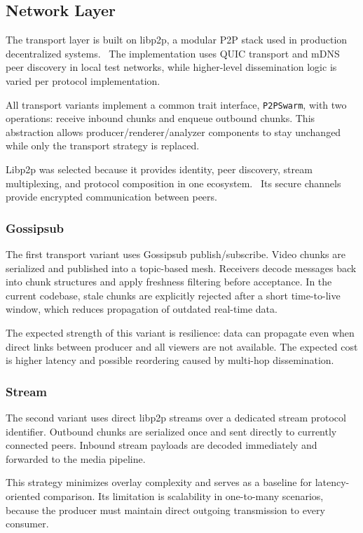 \subsection{Network Layer}
The transport layer is built on libp2p, a modular 
\ac{P2P} stack used in production decentralized systems.~\cite{Libp2pIPFSDocs,Libp2pEthereumMerge}
The implementation uses \ac{QUIC} transport and mDNS peer discovery in local test networks, while higher-level dissemination logic is varied per protocol implementation.~\cite{thomsonUsingTLSSecure2021,cheshireMulticastDNS2013}

All transport variants implement a common trait interface, \texttt{P2PSwarm}, with two operations: receive inbound chunks and enqueue outbound chunks. This abstraction allows producer/renderer/analyzer components to stay unchanged while only the transport strategy is replaced.

Libp2p was selected because it provides identity, peer discovery, stream multiplexing, and protocol composition in one ecosystem.~\cite{Libp2pIPFSDocs} Its secure channels provide encrypted communication between peers.~\cite{SecurityConsiderations}
\subsubsection{Gossipsub}
\label{sec:gossipsub_transport}
The first transport variant uses Gossipsub publish/subscribe. Video chunks are serialized and published into a topic-based mesh. Receivers decode messages back into chunk structures and apply freshness filtering before acceptance. In the current codebase, stale chunks are explicitly rejected after a short time-to-live window, which reduces propagation of outdated real-time data.

The expected strength of this variant is resilience: data can propagate even when direct links between producer and all viewers are not available. The expected cost is higher latency and possible reordering caused by multi-hop dissemination.
\subsubsection{Stream}
\label{sec:stream_transport}
The second variant uses direct libp2p streams over a dedicated stream protocol identifier. Outbound chunks are serialized once and sent directly to currently connected peers. Inbound stream payloads are decoded immediately and forwarded to the media pipeline.

This strategy minimizes overlay complexity and serves as a baseline for latency-oriented comparison. Its limitation is scalability in one-to-many scenarios, because the producer must maintain direct outgoing transmission to every consumer.
